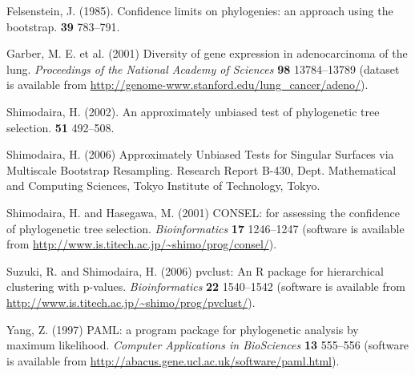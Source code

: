 \documentclass[a4paper]{amsart}
\begin{document}
\begin{thebibliography}{9}

Felsenstein, J.
(1985).
\newblock Confidence limits on phylogenies: an approach using the bootstrap.
 {\bf 39} 783--791.

  Garber, M. E. et al. (2001)
\newblock Diversity of gene expression in adenocarcinoma of the lung.
\newblock \emph{Proceedings of the National Academy of Sciences}
  {\bf 98} 13784--13789 (dataset is available from
  \url{http://genome-www.stanford.edu/lung_cancer/adeno/}).

Shimodaira, H.
(2002).
\newblock An approximately unbiased test of phylogenetic tree selection.
 {\bf 51} 492--508.

Shimodaira, H.
(2006)
\newblock Approximately Unbiased Tests for Singular
Surfaces via Multiscale Bootstrap Resampling.
\newblock Research Report {B}-430, Dept. Mathematical and Computing
  Sciences, Tokyo Institute of Technology, Tokyo.

Shimodaira, H. and Hasegawa, M. (2001)
\newblock CONSEL: for assessing the
  confidence of phylogenetic tree selection.
\newblock \emph{Bioinformatics} {\bf 17} 1246--1247 (software is available from
  \url{http://www.is.titech.ac.jp/~shimo/prog/consel/}).

Suzuki, R. and Shimodaira, H. (2006)
\newblock pvclust: An R package for hierarchical clustering with p-values.
\newblock \emph{Bioinformatics} {\bf 22} 1540--1542 (software is available from
\url{http://www.is.titech.ac.jp/~shimo/prog/pvclust/}).

Yang, Z. (1997)
\newblock  PAML: a program package for phylogenetic analysis by
  maximum likelihood.
\newblock \emph{Computer Applications in BioSciences}
{\bf 13} 555--556 (software is available from
  \url{http://abacus.gene.ucl.ac.uk/software/paml.html}).


\end{thebibliography}
\end{document}
